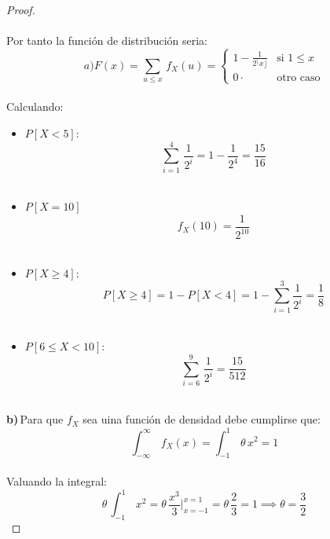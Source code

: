 \documentclass[11pt,letterpaper]{article}
\begin{document}
\begin{proof}
\begin{equation*}
\end{equation*}\,\\
Por tanto la funci\'on de distribuci\'on seria:\,\\
\begin{equation*}
    a)F(x)=\sum_{u\leq x}\,f_X(u)=\begin{cases} 
      1-\frac{1}{2^\lfloor x\rfloor }             & \mbox{si } 1\leq x  \\
      0 \cdot                         & \text{otro caso}
   \end{cases}
\end{equation*}\,\\
Calculando:\,\\
\begin{itemize}
  \item $P[X<5]$:\,\\
  \begin{equation*}
    \sum_{i=1}^{4}\,\frac{1}{2^i}=1-\frac{1}{2^4}=\frac{15}{16}
  \end{equation*}\,\\
  \item $P[X=10]$\,\\
  \begin{equation*}
    f_X(10)=\frac{1}{2^{10}}
  \end{equation*}\,\\
  \item $P[X\geq 4]$:\,\\
  \begin{equation*}
    P[X\geq 4]=1-P[X<4]=1-\sum_{i=1}^{3}\frac{1}{2^i}=\frac{1}{8}
  \end{equation*}\,\\
  \item $P[6\leq X<10]$:\,\\
  \begin{equation*}
    \sum_{i=6}^{9}\,\frac{1}{2^i}=\frac{15}{512}
  \end{equation*}
\end{itemize}\,\\
\textbf{b)}\,Para que $f_X$ sea uina funci\'on de densidad debe cumplirse que:\,\\
\begin{equation*}
  \int_{-\infty}^{\infty}\,f_X(x)=\int_{-1}^{1}\,\theta\,x^2=1
\end{equation*}\,\\
Valuando la integral:\,\\
\begin{equation*}
  \theta\,\int_{-1}^{1}\,x^2=\theta\,\frac{x^3}{3}\big|_{x = -1}^{x = 1}=\theta\,\frac{2}{3}=1\implies \theta=\frac{3}{2}

\end{equation*}
\end{proof}
\end{document}
